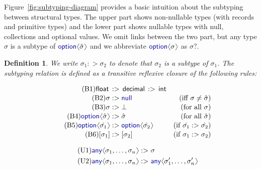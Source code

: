 \documentclass[10pt,preprint,clearpagebib]{sigplanconf}
\newcommand{\langl}{\begin{picture}(4.5,7)
\put(1.1,2.5){\rotatebox{60}{\line(1,0){5.5}}}
\put(1.1,2.5){\rotatebox{300}{\line(1,0){5.5}}}
\end{picture}}
\newcommand{\rangl}{\begin{picture}(4.5,7)
\put(.9,2.5){\rotatebox{120}{\line(1,0){5.5}}}
\put(.9,2.5){\rotatebox{240}{\line(1,0){5.5}}}
\end{picture}}
\newcommand{\kvd}[1]{\textnormal{\textcolor{kvdclr}{\sffamily #1}}}
\newcommand{\ident}[1]{\textnormal{\sffamily #1}}
\newtheorem{definition}{Definition}
\begin{document}
Figure~\ref{fig:subtyping-diagram} provides a basic intuition about the subtyping between
structural types. The upper part shows non-nullable types (with records and primitive types) and 
the lower part shows nullable types with \kvd{null}, collections and optional values. We omit links 
between the two part, but any type $\hat{\sigma}$ is a subtype of $\kvd{option}\langl\hat{\sigma}\rangl$ 
and we abbreviate $\kvd{option}\langl\sigma\rangl$ as $\sigma?$. 

\begin{definition}
We write $\sigma_1 :> \sigma_2$ to denote that $\sigma_2$ is a subtype of $\sigma_1$. The 
subtyping relation is defined as a transitive reflexive closure of the following rules:

\vspace{0.5em}
\noindent{}
\begin{align}
\label{eq:sub-prim}\tag{B1}
\ident{float}\,&:>\,\ident{decimal}\,:>\,\ident{int}&\\[-0.2em]
\label{eq:sub-null}\tag{B2}
\sigma &:> \kvd{null}  &(\textnormal{iff}~\sigma \neq \hat{\sigma}) \\[-0.2em]
\label{eq:sub-bot}\tag{B3}
\sigma &:> \bot  &(\textnormal{for all}~\sigma)\\[-0.2em]
\label{eq:sub-opt}\tag{B4}
\kvd{option}\langl\hat{\sigma}\rangl &:> \hat{\sigma}  &(\textnormal{for all}~\hat{\sigma})\\[-0.2em]
\label{eq:sub-opt-cov}\tag{B5}
\kvd{option}\langl\hat{\sigma_1}\rangl &:> 
  \kvd{option}\langl\hat{\sigma_2}\rangl  &(\textnormal{if}~\hat{\sigma_1} :> \hat{\sigma_2})\\[-0.2em]
\label{eq:sub-col}\tag{B6}
[\sigma_1] &:> [\sigma_2]  &(\textnormal{if}~\sigma_1 :> \sigma_2)
\end{align}

\noindent{}
\begin{align}
\label{eq:sub-var-bot}\tag{U1}
\kvd{any}\langl \sigma_1, \ldots, \sigma_n\rangl :>&~ \sigma \\
\label{eq:sub-var-eq}\tag{U2}
\kvd{any}\langl \sigma_1, \ldots, \sigma_n \rangl :>&~ \kvd{any}\langl \sigma_1', \ldots, \sigma_n' \rangl
\end{align}


\end{definition}
\end{document}
